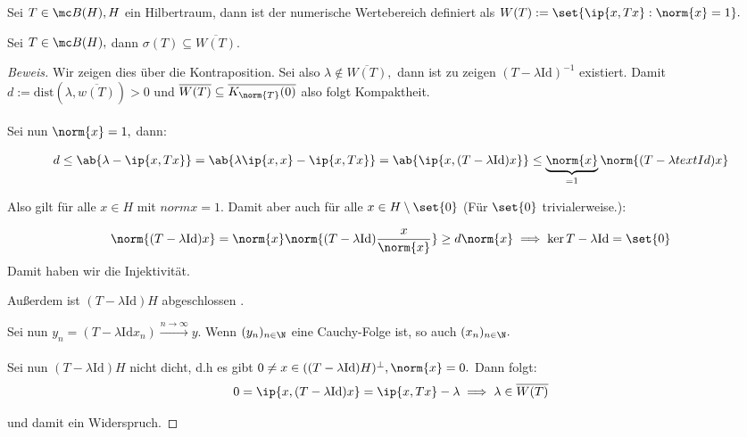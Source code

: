 \begin{definition} Sei $T \in \mc B(H), H$ ein Hilbertraum, dann ist der numerische Wertebereich definiert als $W(T) := \set{\ip{x, Tx}: \norm{x} = 1}.$ 
	
\end{definition}


\begin{theorem} \label{num_spec} Sei $T \in \mc B(H),$ dann $\sigma(T) \subseteq \overline{W(T)}.$
	
	\begin{proof}[Beweis] Wir zeigen dies über die Kontraposition. Sei also $\lambda \notin \overline{W(T)},$ dann ist zu zeigen $(T-\lambda\text{Id})^{-1}$ existiert. Damit $d := \text{dist}(\lambda, \overline{w(T)}) > 0$ und $\overline{W(T)} \subseteq \overline{K_{\norm{T}}(0)}$ also folgt Kompaktheit. \\ \\
		
		Sei nun $\norm{x} = 1,$ dann:
		
		\[d \leq \ab{\lambda - \ip{x, Tx}} = \ab{\lambda \ip{x, x} - \ip{x, Tx}} = \ab{\ip{x, (T-\lambda \text{Id})x}} \leq \underbrace{\norm{x}}_{= 1} \norm{(T-\lambda{text{Id}})x}\]
		
		Also gilt für alle $x \in H$ mit $norm{x} = 1.$ Damit aber auch für alle $x \in H\setminus \set{0}$ (Für $\set{0}$ trivialerweise.): \[\]
		
		\[\norm{(T-\lambda \text{Id})x} = \norm{x} \norm{(T-\lambda \text{Id})\frac{x}{\norm{x}}} \geq d \norm{x} \implies \ker{T - \lambda \text{Id}} = \set{0}\] Damit haben wir die Injektivität. %
		
		Außerdem ist $(T- \lambda \text{Id})H$ abgeschlossen .
		
		Sei nun $y_n = (T-\lambda \text{Id}x_n) \xrightarrow{n \to \infty} y.$ Wenn $(y_n)_{n \in \N}$ eine Cauchy-Folge ist, so auch $(x_n)_{n \in \N}.$ \\ \\
		
		Sei nun $(T- \lambda \text{Id})H$ nicht dicht, d.h es gibt $0 \not= x \in ((T-\lambda \text{Id})H)^{\perp}, \norm{x} = 0.$ Dann folgt: \[0 = \ip{x, (T- \lambda \text{Id})x} = \ip{x, Tx}-\lambda \implies \lambda \in \overline{W(T)}\]
		
		und damit ein Widerspruch. 
		
	\end{proof}
	
\end{theorem}


